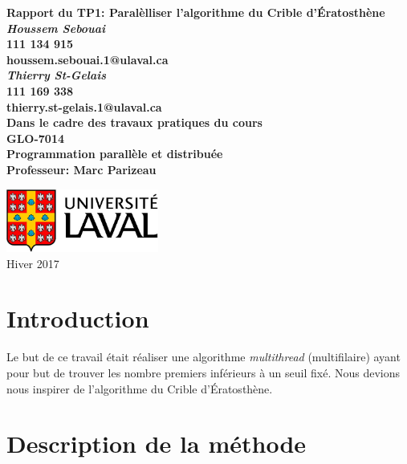 \documentclass{report}
\begin{document}
\renewcommand{\labelitemi}{$\bullet$}
\thispagestyle{empty}

\begin{center}
	\vspace*{1cm}
	\huge  \bf Rapport du TP1: Paralèlliser l'algorithme du Crible d'Ératosthène\\
	\vspace{2.5cm}
	\normalsize
	\textit{Houssem Sebouai}\\
	111 134 915\\
	houssem.sebouai.1@ulaval.ca\\

  \vspace{1cm}
	\normalsize
	\textit{Thierry St-Gelais}\\
111 169 338\\
thierry.st-gelais.1@ulaval.ca\\

	\vspace{2cm}
	Dans le cadre des travaux pratiques du cours\\
	\LARGE GLO-7014\\
	\large Programmation parallèle et distribuée\\
	Professeur: Marc Parizeau

	\vfill
	\includegraphics[width=5cm]{Images/logo.jpg}
	\\
	Hiver 2017
\end{center}

\newpage

\tableofcontents
\listoffigures
\listoftables
\newpage
\chapter{Introduction}

	Le but de ce travail était réaliser une algorithme {\it multithread} (multifilaire)
	ayant pour but de trouver les nombre premiers inférieurs à un seuil fixé.
	Nous devions nous inspirer de l'algorithme du Crible d'Ératosthène.

\newpage
\chapter{Description de la méthode}
\end{document}
